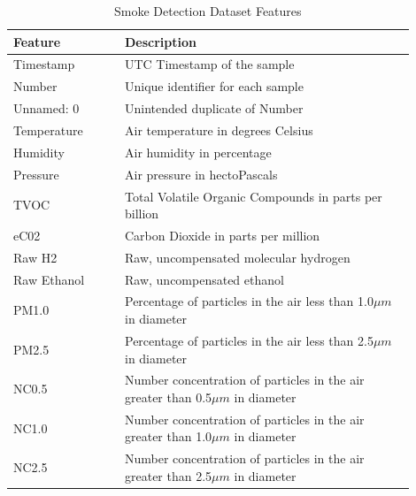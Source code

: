 \documentclass[conference]{IEEEtran}
\begin{document}
\begin{table}[ht]
    \begingroup
    \renewcommand{\arraystretch}{1.5} %
    \begin{tabular}{|p{0.25\linewidth}|p{0.65\linewidth}|}
        \hline
        \textbf{Feature} & \textbf{Description} \\
        \hline
        Timestamp & UTC Timestamp of the sample \\
        \hline
        Number & Unique identifier for each sample \\
        \hline
        Unnamed: 0 & Unintended duplicate of Number \\
        \hline
        Temperature & Air temperature in degrees Celsius \\
        \hline
        Humidity & Air humidity in percentage \\
        \hline
        Pressure & Air pressure in hectoPascals \\
        \hline
        TVOC & Total Volatile Organic Compounds in parts per
        billion \\
        \hline
        eC02 & Carbon Dioxide in parts per million \\
        \hline
        Raw H2 & Raw, uncompensated molecular hydrogen \\
        \hline
        Raw Ethanol & Raw, uncompensated ethanol \\
        \hline
        PM1.0 & Percentage of particles in the air less than
        1.0$\mu m$ in diameter \\
        \hline
        PM2.5 & Percentage of particles in the air less than
        2.5$\mu m$ in diameter \\
        \hline
        NC0.5 & Number concentration of particles in the air
        greater than 0.5$\mu m$ in diameter \\
        \hline
        NC1.0 & Number concentration of particles in the air
        greater than 1.0$\mu m$ in diameter \\
        \hline
        NC2.5 & Number concentration of particles in the air
        greater than 2.5$\mu m$ in diameter \\
        \hline
    \end{tabular}
    \vspace{1pt}
    \caption{Smoke Detection Dataset Features}
    \label{tab:features}
    \endgroup
\end{table}
\end{document}
